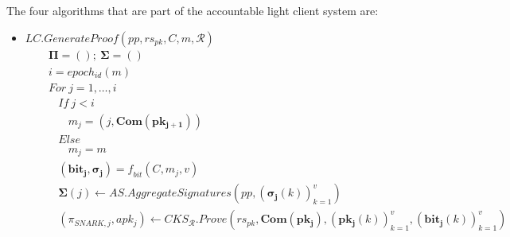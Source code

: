 \noindent The four algorithms that are part of the accountable light client system are: 
\begin{itemize}
\item $\mathit{LC.GenerateProof}(\mathit{pp}, \mathit{rs_{\mathit{pk}}}, C, m, \mathcal{R})$
\begin{align*}
&\ \ \ \ \mathbf{\Pi} = (); \ \mathbf{\Sigma} = () \\
&\ \ \ \ i = \mathit{epoch_{id}}(m) \\
&\ \ \ \ \mathit{For} \ j = 1, \ldots, i \\
&\ \ \ \ \ \ \ \ \mathit{If} \  j < i  \\
&\ \ \ \ \ \ \ \ \ \ \ \ \mathit{m_j}= (j,\mathbf{Com}(\mathbf{pk_{j+1}})) \\
&\ \ \ \ \ \ \ \ \mathit{Else} \\
&\ \ \ \ \ \ \ \ \ \ \ \ \mathit{m_j} = m  \\
&\ \ \ \ \ \ \ \ (\mathbf{bit_j}, \mathbf{\sigma_j}) = \mathit{f_{bit}}(C, m_j, v) \\
&\ \ \ \ \ \ \ \ \mathbf{\Sigma}(j) \leftarrow \mathit{AS.AggregateSignatures}(\mathit{pp}, (\mathbf{\sigma_j}(k))_{k=1}^v) \\ 
&\ \ \ \ \ \ \ \ (\mathit{\pi_{\mathit{SNARK},j}}, \mathit{apk_j}) \leftarrow \mathit{CKS_{\mathcal{R}}.Prove}(\mathit{rs}_{pk}, \mathbf{Com}(\mathbf{pk_{j}}), (\mathbf{pk_{j}}(k))_{k=1}^{v}, (\mathbf{bit_j}(k))_{k=1}^{v})\\

\end{align*}
\end{itemize}
